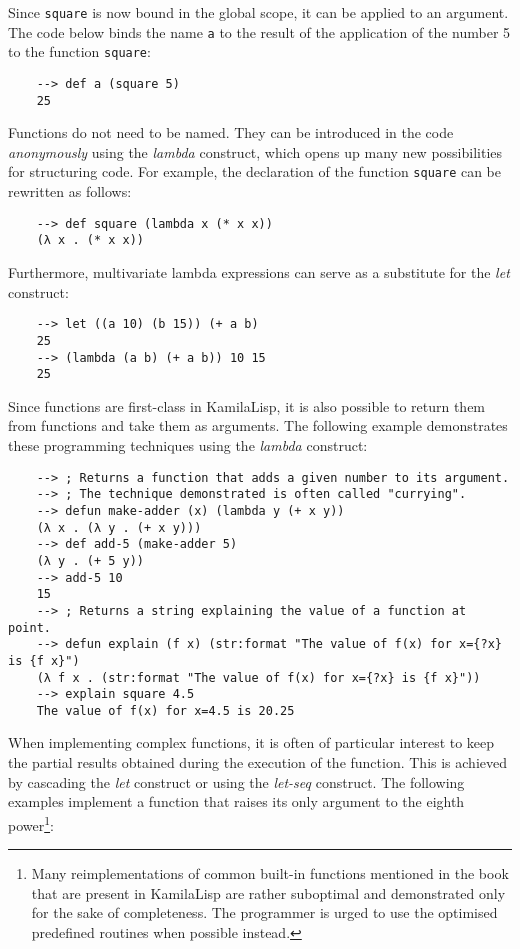 Since \verb|square| is now bound in the global scope, it can be applied to an argument. The code below binds the name \verb|a| to the result of the application of the number 5 to the function \verb|square|:

\begin{Verbatim}
    --> def a (square 5)
    25
\end{Verbatim}

Functions do not need to be named. They can be introduced in the code \textit{anonymously} using the \textit{lambda} construct, which opens up many new possibilities for structuring code. For example, the declaration of the function \verb|square| can be rewritten as follows:

\begin{Verbatim}
    --> def square (lambda x (* x x))
    (λ x . (* x x))
\end{Verbatim}

Furthermore, multivariate lambda expressions can serve as a substitute for the \textit{let} construct:

\begin{Verbatim}
    --> let ((a 10) (b 15)) (+ a b)
    25
    --> (lambda (a b) (+ a b)) 10 15
    25
\end{Verbatim}

Since functions are first-class in KamilaLisp, it is also possible to return them from functions and take them as arguments. The following example demonstrates these programming techniques using the \textit{lambda} construct:

\begin{Verbatim}
    --> ; Returns a function that adds a given number to its argument.
    --> ; The technique demonstrated is often called "currying".
    --> defun make-adder (x) (lambda y (+ x y))
    (λ x . (λ y . (+ x y)))
    --> def add-5 (make-adder 5)
    (λ y . (+ 5 y))
    --> add-5 10
    15
    --> ; Returns a string explaining the value of a function at point.
    --> defun explain (f x) (str:format "The value of f(x) for x={?x} is {f x}")
    (λ f x . (str:format "The value of f(x) for x={?x} is {f x}"))
    --> explain square 4.5
    The value of f(x) for x=4.5 is 20.25
\end{Verbatim}

When implementing complex functions, it is often of particular interest to keep the partial results obtained during the execution of the function. This is achieved by cascading the \textit{let} construct or using the \textit{let-seq} construct. The following examples implement a function that raises its only argument to the eighth power\footnote{Many reimplementations of common built-in functions mentioned in the book that are present in KamilaLisp are rather suboptimal and demonstrated only for the sake of completeness. The programmer is urged to use the optimised predefined routines when possible instead.}:

